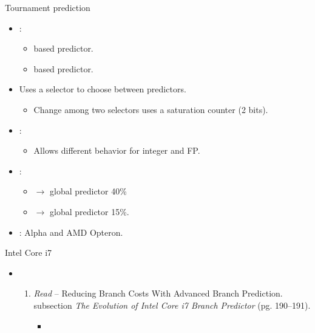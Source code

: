 \begin{frame}[t]{Tournament prediction}
\begin{itemize}
  \item {}:
    \begin{itemize}
      \item {} based predictor.
      \item {} based predictor.
    \end{itemize}
  \item Uses a selector to choose between predictors.
    \begin{itemize}
      \item Change among two selectors uses a saturation counter (2 bits).
    \end{itemize}
  \item {}:
    \begin{itemize}
      \item Allows different behavior for integer and FP.
    \end{itemize}
  \item {}:
    \begin{itemize}
      \item {} $\rightarrow$ global predictor 40\%
      \item {} $\rightarrow$ global predictor 15\%.
    \end{itemize}
  \item {}: Alpha and AMD Opteron.
\end{itemize}
\end{frame}


\begin{frame}[t]{Intel Core i7}
\begin{itemize}
  \item {}
    \begin{enumerate}
      \item \emph{Read}  -- 
            Reducing Branch Costs With Advanced Branch Prediction.\\
             subsection 
            \emph{The Evolution of Intel Core i7 Branch Predictor}
            (pg. 190--191).
        \begin{itemize}
          \item \bibhennessy
        \end{itemize}
    \end{enumerate}
\end{itemize}
\end{frame}
